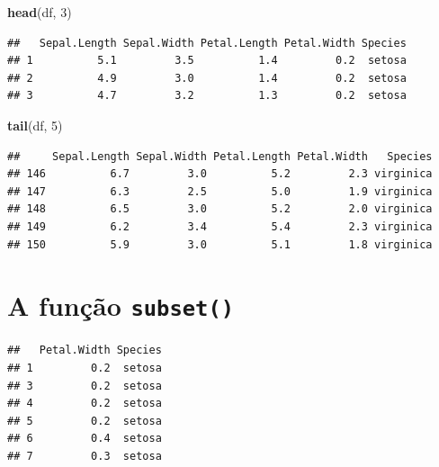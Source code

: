 \documentclass[
]{book}
\newenvironment{Shaded}{\begin{snugshade}}{\end{snugshade}}
\newcommand{\DecValTok}[1]{\textcolor[rgb]{0.00,0.00,0.81}{#1}}
\newcommand{\FunctionTok}[1]{\textcolor[rgb]{0.13,0.29,0.53}{\textbf{#1}}}
\newcommand{\NormalTok}[1]{#1}
\newcommand{\OtherTok}[1]{\textcolor[rgb]{0.56,0.35,0.01}{#1}}
\newcommand{\SpecialCharTok}[1]{\textcolor[rgb]{0.81,0.36,0.00}{\textbf{#1}}}
\newcommand{\StringTok}[1]{\textcolor[rgb]{0.31,0.60,0.02}{#1}}
\theoremstyle{definition}
\theoremstyle{definition}
\theoremstyle{definition}
\theoremstyle{definition}
\theoremstyle{remark}
\begin{document}
\begin{Shaded}
\begin{Highlighting}[]
\FunctionTok{head}\NormalTok{(df, }\DecValTok{3}\NormalTok{)}
\end{Highlighting}
\end{Shaded}

\begin{verbatim}
##   Sepal.Length Sepal.Width Petal.Length Petal.Width Species
## 1          5.1         3.5          1.4         0.2  setosa
## 2          4.9         3.0          1.4         0.2  setosa
## 3          4.7         3.2          1.3         0.2  setosa
\end{verbatim}

\begin{Shaded}
\begin{Highlighting}[]
\FunctionTok{tail}\NormalTok{(df, }\DecValTok{5}\NormalTok{)}
\end{Highlighting}
\end{Shaded}

\begin{verbatim}
##     Sepal.Length Sepal.Width Petal.Length Petal.Width   Species
## 146          6.7         3.0          5.2         2.3 virginica
## 147          6.3         2.5          5.0         1.9 virginica
## 148          6.5         3.0          5.2         2.0 virginica
## 149          6.2         3.4          5.4         2.3 virginica
## 150          5.9         3.0          5.1         1.8 virginica
\end{verbatim}

\section{\texorpdfstring{A função \texttt{subset()}}{A função subset()}}\label{a-funuxe7uxe3o-subset}

\begin{Shaded}
\end{Shaded}

\begin{verbatim}
##   Petal.Width Species
## 1         0.2  setosa
## 3         0.2  setosa
## 4         0.2  setosa
## 5         0.2  setosa
## 6         0.4  setosa
## 7         0.3  setosa
\end{verbatim}
\end{document}
